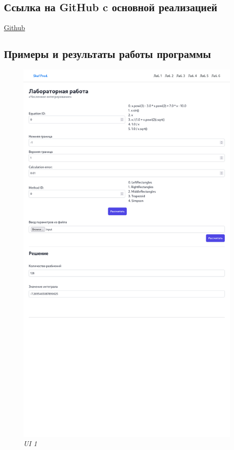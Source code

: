 \documentclass{article}
\begin{document}
      \subsection{Ссылка на GitHub c основной реализацией}
            \href{https://github.com/isofinly/compmath}{Github}

      \subsection{Примеры и результаты работы программы}
            \begin{figure}[H] 
                  \begin{center}  
                         \includegraphics[scale=0.3]{ui2.png}
                        \caption{\small \sl {UI  1}}  
                  \end{center}  
            \end{figure}
\end{document}
